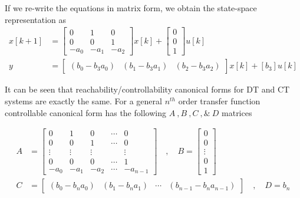 \documentclass[twoside]{article}
\begin{document}
%
If we re-write the equations in matrix form, we obtain the state-space representation as
%
\begin{align*}
	x[k+1] &= \left[ \begin{array}{ccc} 0 & 1 & 0  \\  0 & 0 & 1 \\  -a_0 & -a_1 & -a_2 \end{array} \right] x[k] 
	+ \left[ \begin{array}{c} 0 \\ 0 \\ 1 \end{array} \right] u[k]
	\\
	y &= \left[ \begin{array}{ccc} ( b_0 - b_3 a_0 ) & ( b_1 - b_3 a_1 )  & ( b_2 - b_3 a_2 ) \end{array} \right] x[k]
	+ \left[ b_3 \right] u[k]
\end{align*}

It can be seen that reachability/controllability canonical forms for
DT and CT systems are exactly the same.  For a general $n^{th}$ order transfer function controllable
canonical form has the following $A \ ,  B \ ,  C \ , \& \ D$
matrices

\begin{align*}
A &= \left[ \begin{array}{ccccc} 0 & 1 & 0 & \cdots & 0 \\ 0 & 0 & 1 &
                                                                      \cdots & 0
\\ \vdots & \vdots & \vdots & & \vdots
\\ 0 & 0 & 0 & \cdots & 1
    \\ -a_0 & -a_1 & -a_2 & \cdots & -a_{n-1} \end{array} \right]
\quad , \quad 
B = \left[ \begin{array}{c} 0\\ 0 \\ \vdots \\ 0
    \\ 1 \end{array} \right]
\\ C &= \left[ \begin{array}{cccc} (b_0 - b_n a_0) 
  &  (b_1 - b_n a_1) & \cdots & (b_{n-1} - b_n a_{n-1}) \end{array} \right]
\quad , \quad
D = b_n
\end{align*}

%
\end{document}
